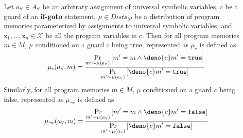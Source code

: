 \documentclass[acmsmall,review,anonymous]{acmart}\settopmatter{printfolios=true,printccs=false,printacmref=false}
\begin{document}
\begin{definition}
  \label{def:branching}
  Let $a_{\forall} \in \mathit{A}_{\forall}$ be an arbitrary assignment of universal symbolic variables, $c$ be a guard of an \textbf{if-goto} statement, $\mu \in \mathit{Dists_M}$ be a distribution of program memories parameterized by assignments to universal symbolic variables, and $\mathtt{x}_1,\ldots,\mathtt{x}_n \in \mathcal{X}$ be all the program variables in $c$. Then for all program memories $m \in \mathit{M}$, $\mu$ conditioned on a guard $c$ being true, represented as $\mu_c$ is defined as
  \[
    \mu_c(a_{\forall},m) = \frac{\displaystyle\Pr_{m' \sim \mu(a_{\forall})}\left[ m' = m \land \deno{c}m' = \mathtt{true} \right]}{\displaystyle\Pr_{m' \sim \mu(a_{\forall})}\left[ \deno{c}m' = \mathtt{true} \right]}
  \]
  Similarly, for all program memories $m \in \mathit{M}$, $\mu$ conditioned on a guard $c$ being false, represented as $\mu_{\neg c}$ is defined as
  \[
    \mu_{\neg c}(a_{\forall},m) = \frac{\displaystyle\Pr_{m' \sim \mu(a_{\forall})}\left[ m' = m \land \deno{c}m' = \mathtt{false} \right]}{\displaystyle\Pr_{m' \sim \mu(a_{\forall})}\left[ \deno{c}m' = \mathtt{false} \right]}
  \]
\end{definition}
\end{document}

